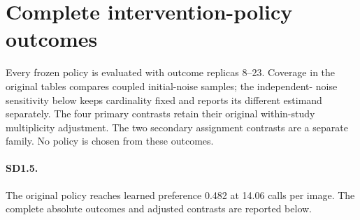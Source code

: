 \section{Complete intervention-policy outcomes}
\label{supp:policy_outcomes}
Every frozen policy is evaluated with outcome replicas 8--23. Coverage in
the original tables compares coupled initial-noise samples; the independent-
noise sensitivity below keeps cardinality fixed and reports its different
estimand separately. The four primary contrasts retain their original within-study multiplicity adjustment. The two secondary assignment contrasts are a separate family. No policy is chosen from these outcomes.
\paragraph{SD1.5.}
The original policy reaches learned preference 0.482 at 14.06 calls per image.
The complete absolute outcomes and adjusted contrasts are reported below.
